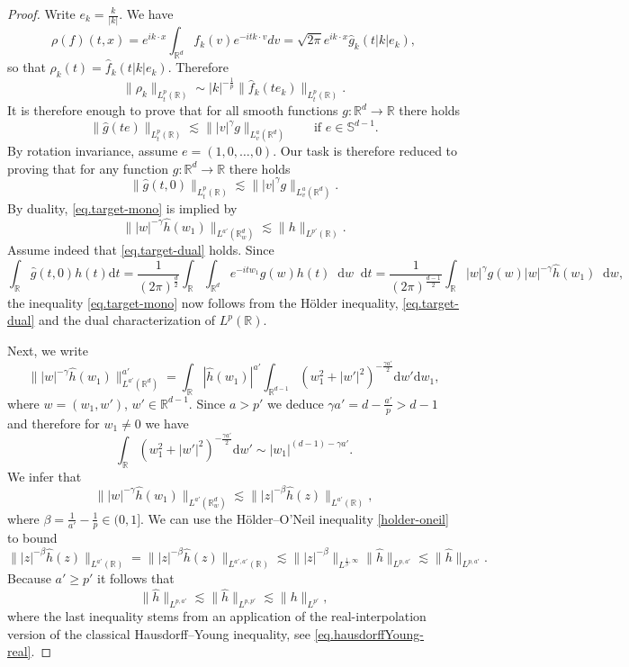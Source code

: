 \documentclass[11pt,a4paper,reqno]{amsart}
\theoremstyle{plain}
\theoremstyle{remark}
\newcommand{\dd}{\mathop{}\!\mathrm{d}}
\begin{document}
\begin{proof} 
Write $e_k=\frac{k}{|k|}$. We have
\[
    \rho(f)(t,x) = e^{ik\cdot x}\int_{\mathbb R^d}f_k(v)e^{-itk\cdot v}dv = \sqrt{2\pi} e^{ik\cdot x}\widehat g_k(t|k|e_k),
\]
so that $\rho_k(t)=\widehat{f}_k(t|k|e_k)$. Therefore
\[
    \|\rho_k\|_{L^p_{t}(\mathbb{R})} \sim |k|^{-\frac{1}{p}} \|\widehat f_k(te_k)\|_{L^p_t(\mathbb R)}.
\]
It is therefore enough to prove that for all smooth functions $g : \mathbb{R}^d \to \mathbb{R}$ there holds 
\[
    \|\widehat g(t e)\|_{L^p_t(\mathbb R)} \lesssim \||v|^\gamma g\|_{L^a_v(\mathbb R^d)} \qquad \mbox{if $e \in \mathbb{S}^{d-1}$.}
\]
By rotation invariance, assume $e=(1,0, \dots, 0)$. Our task is therefore reduced to proving that for any function $g : \mathbb{R}^d \to \mathbb{R}$ there holds
\begin{equation}
    \label{eq.target-mono}
    \|\widehat{g}(t, 0)\|_{L^{p}_t(\mathbb{R})} \lesssim \||v|^{\gamma}g\|_{L^a_v(\mathbb{R}^d)}.
\end{equation}
By duality, \eqref{eq.target-mono} is implied by 
\begin{equation}
    \label{eq.target-dual}
    \||w| ^{-\gamma}\widehat{h}(w_1)\|_{L^{a'}(\mathbb{R}^d_w)} \lesssim \|h\|_{L^{p'}(\mathbb{R})}.
\end{equation}  
Assume indeed that \eqref{eq.target-dual} holds. Since
\[
    \int_{\mathbb{R}} \widehat{g}(t,0)h(t)\mathrm{d}t = \frac{1}{(2\pi)^{\frac{d}{2}}} \int_{\mathbb{R}}\int_{\mathbb{R}^d}e^{-itw_1}g(w)h(t)\dd w \dd t = \frac{1}{(2\pi)^{\frac{d-1}{2}}} \int_{\mathbb{R}} |w| ^{\gamma}g(w)|w|^{-\gamma}\widehat{h}(w_1) \dd w,
\]
the inequality \eqref{eq.target-mono} now follows from the Hölder inequality, \eqref{eq.target-dual} and the dual characterization of $L^p(\mathbb{R})$.

Next, we write
\[
    \||w|^{-\gamma}\widehat{h}(w_1)\|_{L^{a'}(\mathbb{R}^d)}^{a'} = \int_{\mathbb{R}} |\widehat{h}(w_1)|^{a'} \int_{\mathbb{R}^{d-1}} \left(w_1^2+|w'|^2\right)^{-\frac{\gamma a'}{2}}\mathrm{d}w' \mathrm{d}w_1,
\]
where $w=(w_1,w')$, $w' \in \mathbb{R}^{d-1}$. Since $a>p'$ we deduce $\gamma a' = d - \frac{a'}{p} >d-1$ and therefore for $w_1\neq 0$ we have
\[
    \int_{\mathbb{R}} \left(w_1^2+|w'|^2\right)^{-\frac{\gamma a'}{2}}\mathrm{d}w' \sim | w_1|^{(d-1)-\gamma a'}. 
\]
We infer that
\[
    \||w|^{-\gamma}\widehat{h}(w_1)\|_{L^{a'}(\mathbb{R}^d_w)} \lesssim \||z|^{-\beta} \widehat{h}(z)\|_{L^{a'}(\mathbb{R})}, 
\]
where $\beta = \frac{1}{a'} - \frac{1}{p} \in (0,1]$. We can use the Hölder--O'Neil inequality \eqref{holder-oneil} to bound 
\[
    \||z|^{-\beta} \widehat{h}(z)\|_{L^{a'}(\mathbb{R})} =\||z|^{-\beta} \widehat{h}(z)\|_{L^{a',a'}(\mathbb{R})}\lesssim \||z|^{-\beta}\|_{L^{\frac{1}{\beta},\infty}}\|\widehat{h}\|_{L^{p,a'}} \lesssim \|\widehat{h}\|_{L^{p,a'}}. 
\]
Because $a'\geq p'$ it follows that 
\[
    \|\widehat{h}\|_{L^{p,a'}} \lesssim \|\widehat{h}\|_{L^{p,p'}} \lesssim \|h\|_{L^{p'}},
\]
where the last inequality stems from an application of the real-interpolation version of the classical Hausdorff--Young inequality, see \eqref{eq.hausdorffYoung-real}.
\end{proof}
\end{document}
